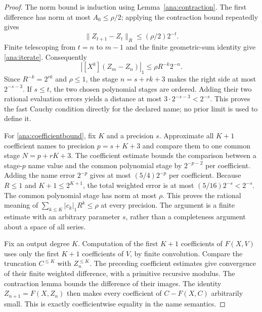 \begin{proof}
The norm bound is induction using Lemma~\ref{ana:contraction}.
The first difference has norm at most $A_0\le\rho/2$; applying the
contraction bound repeatedly gives
\[
 \lVert Z_{t+1}-Z_t\rVert_R\le (\rho/2)2^{-t}.
\]
Finite telescoping from $t=n$ to $m-1$ and the finite geometric-sum
identity give \eqref{ana:iterate}.  Consequently
\[
 |[X^k](Z_m-Z_n)|_1\le\rho R^{-k}2^{-n}.
\]
Since $R^{-k}=2^{rk}$ and $\rho\le1$, the stage
$n=s+rk+3$ makes the right side at most $2^{-s-3}$.
If $s\le t$, the two chosen polynomial stages are ordered.  Adding their
two rational evaluation errors yields a distance at most
$3\cdot2^{-s-3}<2^{-s}$.  This proves the fast Cauchy condition directly
for the declared name; no prior limit is used to define it.

For \eqref{ana:coefficientbound}, fix $K$ and a precision $s$.
Approximate all $K+1$ coefficient names to precision
$p=s+K+3$ and compare them to one common stage
$N=p+rK+3$.  The coefficient estimate bounds the comparison between a
stage-$p$ name value and the common polynomial stage by $2^{-p-2}$
per coefficient.  Adding the name error $2^{-p}$ gives at most
$(5/4)2^{-p}$ per coefficient.  Because $R\le1$ and
$K+1\le2^{K+1}$, the total weighted error is at most
$(5/16)2^{-s}<2^{-s}$.  The common polynomial stage has norm at most $\rho$.
This proves the rational meaning of
$\sum_{k\le K}|c_k|_1R^k\le\rho$ at every precision.  The argument is a
finite estimate with an arbitrary parameter $s$, rather than a
completeness argument about a space of all series.

Fix an output degree $K$.  Computation of the first $K+1$ coefficients
of $F(X,V)$ uses only the first $K+1$ coefficients of $V$, by finite
convolution.  Compare the truncation $C^{\le K}$ with $Z_n^{\le K}$.
The preceding coefficient estimates give convergence of their finite
weighted difference, with a primitive recursive modulus.  The contraction
lemma bounds the difference of their images.  The identity
$Z_{n+1}=F(X,Z_n)$ then makes every coefficient of $C-F(X,C)$ arbitrarily
small.  This is exactly coefficientwise equality in the name semantics.


\end{proof}
